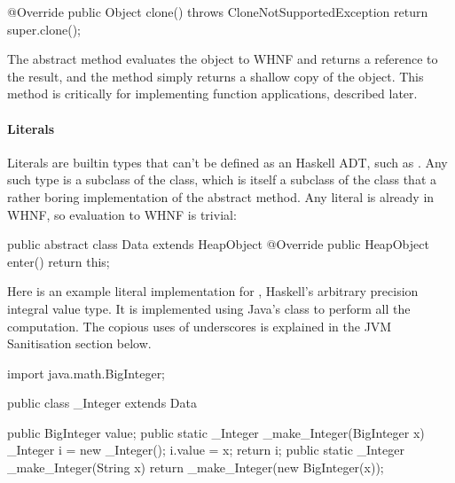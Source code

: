 \documentclass[dissertation.tex]{subfiles}
\begin{document}
{{{\begin{javafigure}
{                @Override
                public Object clone() throws CloneNotSupportedException {
                    return super.clone();
                }
            }
            \end{javafigure}

            The abstract  method evaluates the object to WHNF and returns a reference to the result, and the
             method simply returns a shallow copy of the object. This method is critically for implementing
            function applications, described later.

            \paragraph*{Literals}
            {
                
                Literals are builtin types that can't be defined as an Haskell ADT, such as . Any such type
                is a subclass of the  class, which is itself a subclass of the  class that a
                rather boring implementation of the abstract  method. Any literal is already in WHNF, so
                evaluation to WHNF is trivial:

                \begin{javafigure}
                public abstract class Data extends HeapObject {
                    @Override
                    public HeapObject enter() {
                        return this;
                    }
                }
                \end{javafigure}

                Here is an example literal implementation for , Haskell's arbitrary precision integral
                value type. It is implemented using Java's  class to perform all the computation. The
                copious uses of underscores is explained in the JVM Sanitisation section below.

                \begin{javafigure}
                import java.math.BigInteger;

                public class _Integer extends Data {
                    public BigInteger value;
                    public static _Integer _make_Integer(BigInteger x) {
                        _Integer i = new _Integer();
                        i.value = x;
                        return i;
                    }
                    public static _Integer _make_Integer(String x) {
                        return _make_Integer(new BigInteger(x));
                    }

}
\end{javafigure}}}}}
\end{document}
